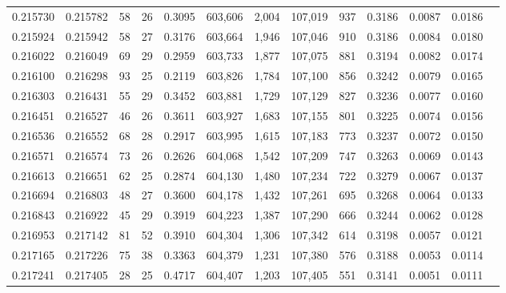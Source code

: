 \begin{tabular}{rrrrrrrrrrrrr}
0.215730 & 0.215782 &    58 &  26 &                                     0.3095 & 603,606 &   2,004 & 107,019 &     937 & 0.3186 & 0.0087 & 0.0186 \\
0.215924 & 0.215942 &    58 &  27 &                                     0.3176 & 603,664 &   1,946 & 107,046 &     910 & 0.3186 & 0.0084 & 0.0180 \\
0.216022 & 0.216049 &    69 &  29 &                                     0.2959 & 603,733 &   1,877 & 107,075 &     881 & 0.3194 & 0.0082 & 0.0174 \\
0.216100 & 0.216298 &    93 &  25 &                                     0.2119 & 603,826 &   1,784 & 107,100 &     856 & 0.3242 & 0.0079 & 0.0165 \\
0.216303 & 0.216431 &    55 &  29 &                                     0.3452 & 603,881 &   1,729 & 107,129 &     827 & 0.3236 & 0.0077 & 0.0160 \\
0.216451 & 0.216527 &    46 &  26 &                                     0.3611 & 603,927 &   1,683 & 107,155 &     801 & 0.3225 & 0.0074 & 0.0156 \\
0.216536 & 0.216552 &    68 &  28 &                                     0.2917 & 603,995 &   1,615 & 107,183 &     773 & 0.3237 & 0.0072 & 0.0150 \\
0.216571 & 0.216574 &    73 &  26 &                                     0.2626 & 604,068 &   1,542 & 107,209 &     747 & 0.3263 & 0.0069 & 0.0143 \\
0.216613 & 0.216651 &    62 &  25 &                                     0.2874 & 604,130 &   1,480 & 107,234 &     722 & 0.3279 & 0.0067 & 0.0137 \\
0.216694 & 0.216803 &    48 &  27 &                                     0.3600 & 604,178 &   1,432 & 107,261 &     695 & 0.3268 & 0.0064 & 0.0133 \\
0.216843 & 0.216922 &    45 &  29 &                                     0.3919 & 604,223 &   1,387 & 107,290 &     666 & 0.3244 & 0.0062 & 0.0128 \\
0.216953 & 0.217142 &    81 &  52 &                                     0.3910 & 604,304 &   1,306 & 107,342 &     614 & 0.3198 & 0.0057 & 0.0121 \\
0.217165 & 0.217226 &    75 &  38 &                                     0.3363 & 604,379 &   1,231 & 107,380 &     576 & 0.3188 & 0.0053 & 0.0114 \\
0.217241 & 0.217405 &    28 &  25 &                                     0.4717 & 604,407 &   1,203 & 107,405 &     551 & 0.3141 & 0.0051 & 0.0111 \\

\end{tabular}
